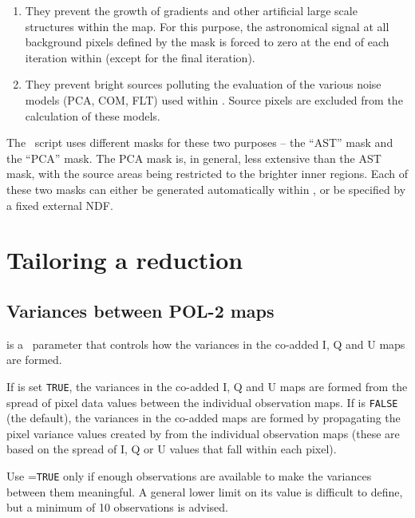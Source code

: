 \begin{enumerate}
\item They prevent the growth of gradients and other artificial large
  scale structures within the map.  For this purpose, the astronomical
  signal at all background pixels defined by the mask is forced to
  zero at the end of each iteration within  (except for the
  final iteration).
\item They prevent bright sources polluting the evaluation of the
  various noise models (PCA, COM, FLT) used within . Source
  pixels are excluded from the calculation of these models.
\end{enumerate}


The \poltwomap\ script uses different masks for these two purposes -- the
``AST'' mask and the ``PCA'' mask.  The PCA mask is, in general, less
extensive than the AST mask, with the source areas being restricted to
the brighter inner regions.  Each of these two masks can either be
generated automatically within \poltwomap, or be specified by a fixed
external NDF.



\section{Tailoring a reduction}
\label{sec:tailoredDR}

\subsection*{Variances between POL-2 maps}

 is a \poltwomap\ parameter that controls how the variances in the
co-added I, Q and U maps are formed.

If  is set \texttt{TRUE}, the variances in the co-added I, Q and U maps
are formed from the spread of pixel data values between the individual
observation maps. If  is \texttt{FALSE} (the default), the variances in
the co-added maps are formed by propagating the pixel variance values
created by  from the individual observation maps (these are
based on the spread of I, Q or U values that fall within each pixel).

Use =\texttt{TRUE} only if enough observations are available to make the
variances between them meaningful. A general lower limit on its value
is difficult to define, but a minimum of 10 observations is advised.


